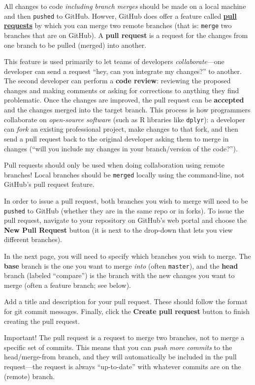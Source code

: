 \documentclass[]{book}
\theoremstyle{definition}
\theoremstyle{definition}
\theoremstyle{remark}
\begin{document}
All changes to code \emph{including branch merges} should be made on a
local machine and then \texttt{pushed} to GitHub. Howver, GitHub does
offer a feature called
\href{https://help.github.com/articles/creating-a-pull-request/}{\textbf{pull
requests}} by which you can merge two remote branches (that is:
\texttt{merge} two branches that are on GitHub). A \textbf{pull request}
is a request for the changes from one branch to be pulled (merged) into
another.

This feature is used primarily to let teams of developers
\emph{collaborate}---one developer can send a request ``hey, can you
integrate my changes?'' to another. The second developer can perform a
\textbf{code review}: reviewing the proposed changes and making comments
or asking for corrections to anything they find problematic. Once the
changes are improved, the pull request can be \textbf{accepted} and the
changes merged into the target branch. This process is how programmers
collaborate on \emph{open-source software} (such as R libraries like
\texttt{dplyr}): a developer can \emph{fork} an existing professional
project, make changes to that fork, and then send a pull request back to
the original developer asking them to merge in changes (``will you
include my changes in your branch/version of the code?'').

Pull requests should only be used when doing collaboration using remote
branches! Local branches should be \texttt{merged} locally using the
command-line, not GitHub's pull request feature.

In order to issue a pull request, both branches you wish to merge will
need to be \texttt{pushed} to GitHub (whether they are in the same repo
or in forks). To issue the pull request, navigate to your repository on
GitHub's web portal and choose the \textbf{New Pull Request} button (it
is next to the drop-down that lets you view different branches).

In the next page, you will need to specify which branches you wish to
merge. The \textbf{base} branch is the one you want to merge \emph{into}
(often \texttt{master}), and the \textbf{head} branch (labeled
``compare'') is the branch with the new changes you want to merge (often
a feature branch; see below).

Add a title and description for your pull request. These should follow
the format for git commit messages. Finally, click the \textbf{Create
pull request} button to finish creating the pull request.

Important! The pull request is a request to merge two branches, not to
merge a specific set of commits. This means that you can \emph{push more
commits} to the head/merge-from branch, and they will automatically be
included in the pull request---the request is always ``up-to-date'' with
whatever commits are on the (remote) branch.
\end{document}

